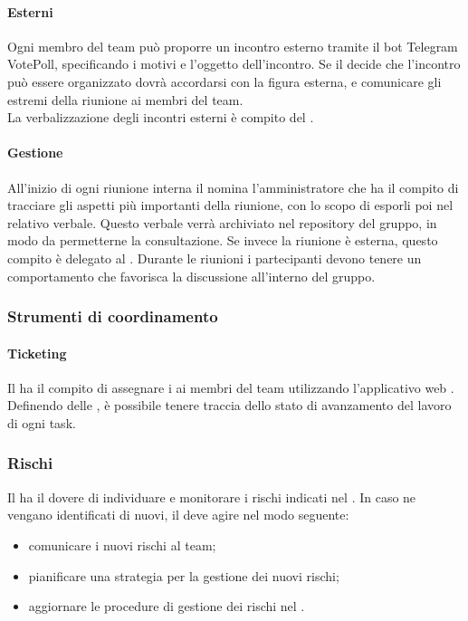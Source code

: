  \paragraph{Esterni}
 Ogni membro del team può proporre un incontro esterno tramite il bot Telegram VotePoll, specificando i motivi e l'oggetto dell'incontro.
Se il \RESP{} decide che l'incontro può essere organizzato dovrà accordarsi con la figura esterna, e comunicare gli estremi della riunione ai membri del team.\\
 La verbalizzazione degli incontri esterni è compito del \RESP.
 \paragraph{Gestione}
 All’inizio di ogni riunione interna il \RESP{} nomina l'amministratore che ha il compito di tracciare gli aspetti più importanti della riunione, con lo scopo di esporli poi nel relativo verbale. Questo verbale verrà archiviato nel repository del gruppo, in modo da permetterne la consultazione. Se invece la riunione è esterna, questo compito è delegato al \RESP{}.
 Durante le riunioni i partecipanti devono tenere un comportamento che favorisca la discussione all’interno del gruppo.

\subsubsection{Strumenti di coordinamento}
 \paragraph{Ticketing}
 Il \RESP{} ha il compito di assegnare i  ai membri del team utilizzando l'applicativo web . \\
 Definendo delle , è possibile tenere traccia dello stato di avanzamento del lavoro di ogni task.

 \subsubsection{Rischi}
 Il \RESP{} ha il dovere di individuare e monitorare i rischi indicati nel \PPdoc. In caso ne vengano identificati di nuovi, il \RESP{} deve agire nel modo seguente:
 \begin{itemize}
  \item comunicare i nuovi rischi al team;
  \item pianificare una strategia per la gestione dei nuovi rischi;
  \item aggiornare le procedure di gestione dei rischi nel \PPdoc.
 \end{itemize}
